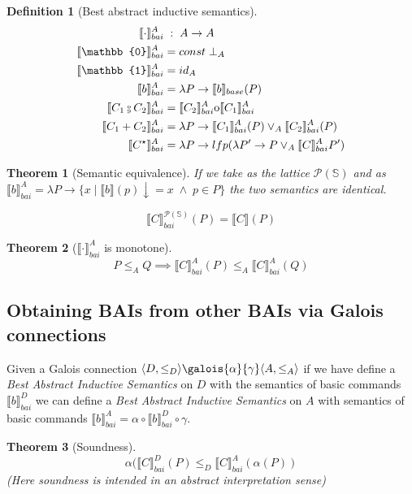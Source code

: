 \documentclass{article}
\newtheorem{definition}{Definition}
\newtheorem{theorem}{Theorem}
\def\rr{\rightarrow}
\newcommand*{\sem}[1]{
    \llbracket #1 \rrbracket
}
\newcommand{\bca}[2]{
    #2_{bai}^{#1}
}
\newcommand{\bsem}[2][A]{
    \bca{#1}{\sem{#2}}
}
\newcommand{\basesem}[2][A]{
    \sem{#2}_{base}
}
\def\fcmp{\mathbin{\raise 0.6ex\hbox{\oalign{\hfil$\scriptscriptstyle      
    \mathrm{o}$\hfil\cr\hfil$\scriptscriptstyle\mathrm{9}$\hfil}}}}
\def\ocirc{\mathrm{o}}
\def\rr{\rightarrow}
\def\state{\mathbb{S}}
\begin{document}
    \begin{definition}[Best abstract inductive semantics]
        \begin{align*}
            \bsem{\cdot}         & \;:\; A \rr A \\
            \bsem{\mathbb{0}}    &= const \; \bot_A \\
            \bsem{\mathbb{1}}    &= id_A \\
            \bsem{b}             &= \lambda P \rr \basesem{b}(P) \\
            \bsem{C_1 \fcmp C_2} &= \bsem{C_2} \ocirc \bsem{C_1} \\
            \bsem{C_1 + C_2}     &= \lambda P \rr 
                \bsem{C_1}(P) \lor_A \bsem{C_2}(P) \\
            \bsem{C^\star}       &= \lambda P \rr lfp(\lambda P' \rr
                P \lor_A \bsem{C} P')
        \end{align*}
    \end{definition}


    \begin{theorem}[Semantic equivalence]
        If we take as the lattice $\mathcal{P}(\state)$ and as $\bsem{b} = \lambda P 
        \rr \{ x \mid \sem{b}(p)\downarrow = x \; \land \; p \in P \}$ the two 
        semantics are identical.

        $$\bsem[\mathcal{P}(\state)]{C}(P) = \sem{C}(P)$$
    \end{theorem}
    
    \begin{theorem}[$\bsem{\cdot}$ is monotone]
        $$P \leq_A Q \implies \bsem{C}(P) \leq_A \bsem{C}(Q)$$
    \end{theorem}

\subsection{Obtaining BAIs from other BAIs via Galois connections}
    Given a Galois connection $\langle D, \leq_D \rangle \galois{\alpha}{\gamma}
    \langle A, \leq_A \rangle$ if we have define a \textit{Best Abstract 
    Inductive Semantics} on $D$ with the semantics of basic commands 
    $\bsem[D]{b}$ we can define a \textit{Best Abstract Inductive Semantics} 
    on $A$ with semantics of basic commands $\bsem[A]{b} = \alpha \circ 
    \bsem[D]{b} \circ \gamma$.

    \begin{theorem}[Soundness]
        $$\alpha(\bsem[D]{C}(P) \leq_D \bsem[A]{C}(\alpha(P))$$
        (Here soundness is intended in an abstract interpretation sense)
    \end{theorem}
\end{document}
